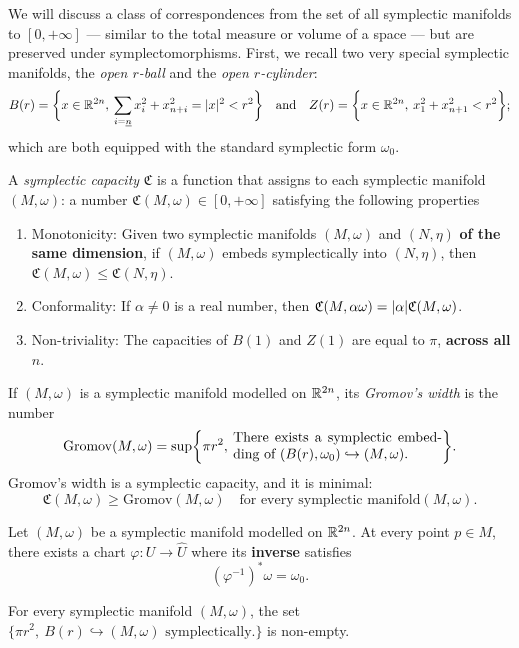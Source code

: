 \documentclass[../main-v2-manifolds.tex]{subfiles}
\begin{document}
\graphicspath{{../images/}{images/}} 

We will discuss a class of correspondences from the set of all symplectic manifolds to $[0,+\infty]$ --- similar to the total measure or volume of a space --- but are preserved under symplectomorphisms. First, we recall two very special symplectic manifolds, the \emph{open $r$-ball} and the \emph{open $r$-cylinder}:
\[
    B(r) = \bigset{x\in\realtn,\: \sum_{i=\underline{n}} x^2_{i} + x^2_{n+i}=\abs{x}^2<r^2}\qqtext{and}Z(r) = \bigset{x\in\realtn,\: x^2_1 + x^2_{n+1}<r^2};
\]
which are both equipped with the standard symplectic form $\omega_0$.
\begin{definition}
    A \emph{symplectic capacity} $\mathfrak{C}$ is a function that assigns to each symplectic manifold $(M,\omega)$:  a number $\mathfrak{C}(M,\omega)\in[0,+\infty]$ satisfying the following properties
    \begin{enumerate}
        \item Monotonicity: Given two symplectic manifolds $(M,\omega)$ and $(N,\eta)$ \textbf{of the same dimension}, if $(M,\omega)$ embeds symplectically into $(N,\eta)$, then $\mathfrak{C}(M,\omega) \leq \mathfrak{C}(N,\eta)$.
        \item Conformality: If $\alpha\neq 0$ is a real number, then $\mathfrak{C}(M,\alpha\omega) = \vert {\alpha} \vert\mathfrak{C}(M,\omega)$.
        \item Non-triviality: The capacities of $B(1)$ and $Z(1)$ are equal to $\pi$, \textbf{across all $n$}.
    \end{enumerate}
\end{definition}
\providecommand{\Grom}{\mathrm{Gromov}}

\begin{wts}
    If $(M,\omega)$ is a symplectic manifold modelled on ${\mathbb{R}^{2n}}$, its \emph{Gromov's width} is the number 
    \[
        \Grom(M,\omega) = \sup\bigset{\pi r^2,\: \parbox{15em}{There exists a symplectic embedding of $(B(r),\omega_0)\hookrightarrow (M,\omega)$.}}.
    \]
    Gromov's width is a symplectic capacity, and it is minimal:
    \[
        \mathfrak{C}(M,\omega)\geq \Grom(M,\omega)\quad\text{for every symplectic manifold} (M,\omega).
    \]
\end{wts}

\begin{wts}\label{wts:darbouxs theorem}
    Let $(M,\omega)$ be a symplectic manifold modelled on ${\mathbb{R}^{2n}}$. At every point $p\in M$, there exists a chart $\varphi: U\to\hat{U}$ where its \textbf{inverse} satisfies
    \[
        (\varphi^{-1})^*\omega = \omega_0.
    \]
\end{wts}
\begin{corollary}
    For every symplectic manifold $(M,\omega)$, the set $\{\pi r^2, \: B(r)\hookrightarrow (M,\omega) \text{ symplectically.}\}$ is non-empty.
\end{corollary}
\end{document}
